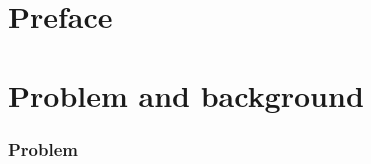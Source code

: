 \documentclass[11pt,british]{article}
\begin{document}
\newpage
\thispagestyle{empty}
\mbox{}




\newpage{}\part*{Preface}

\pagebreak{}


\newpage{}
\begin{abstract}
\pagebreak{}
\end{abstract}


\tableofcontents
\pagebreak


\listoffigures
\pagebreak


\listoftables
\pagebreak


\part{Problem and background}


\section{Problem}
\end{document}
